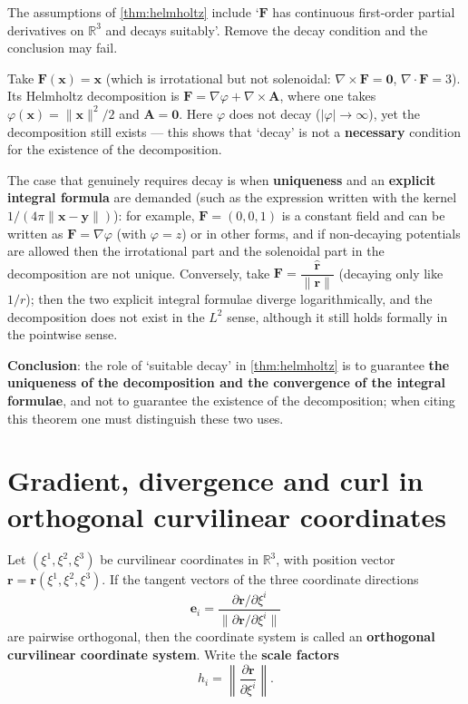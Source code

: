 \begin{example}\label{ex:helmholtz_decay_fails}
The assumptions of \cref{thm:helmholtz} include `$\mathbf F$ has continuous first-order partial derivatives on $\mathbb R^3$ and decays suitably'. Remove the decay condition and the conclusion may fail.

Take $\mathbf F(\mathbf x) = \mathbf x$ (which is irrotational but not solenoidal: $\nabla\times\mathbf F=\mathbf 0$, $\nabla\cdot\mathbf F=3$). Its Helmholtz decomposition is $\mathbf F = \nabla\varphi+\nabla\times\mathbf A$, where one takes $\varphi(\mathbf x)=\|\mathbf x\|^2/2$ and $\mathbf A=\mathbf 0$. Here $\varphi$ does not decay ($|\varphi|\to\infty$), yet the decomposition still exists --- this shows that `decay' is not a \textbf{necessary} condition for the existence of the decomposition.

The case that genuinely requires decay is when \textbf{uniqueness} and an \textbf{explicit integral formula} are demanded (such as the expression written with the kernel $1/(4\pi\|\mathbf x-\mathbf y\|)$): for example, $\mathbf F=(0,0,1)$ is a constant field and can be written as $\mathbf F=\nabla\varphi$ (with $\varphi=z$) or in other forms, and if non-decaying potentials are allowed then the irrotational part and the solenoidal part in the decomposition are not unique. Conversely, take $\mathbf F=\dfrac{\hat{\mathbf r}}{\|\mathbf r\|}$ (decaying only like $1/r$); then the two explicit integral formulae diverge logarithmically, and the decomposition does not exist in the $L^2$ sense, although it still holds formally in the pointwise sense.

\textbf{Conclusion}: the role of `suitable decay' in \cref{thm:helmholtz} is to guarantee \textbf{the uniqueness of the decomposition and the convergence of the integral formulae}, and not to guarantee the existence of the decomposition; when citing this theorem one must distinguish these two uses.
\end{example}

\section{Gradient, divergence and curl in orthogonal curvilinear coordinates}

\begin{definition}\label{def:orthogonal_curvilinear}
Let $(\xi^1,\xi^2,\xi^3)$ be curvilinear coordinates in $\mathbb R^3$, with position vector $\mathbf r = \mathbf r(\xi^1,\xi^2,\xi^3)$. If the tangent vectors of the three coordinate directions
\[
\mathbf e_i = \frac{\partial\mathbf r/\partial\xi^i}{\|\partial\mathbf r/\partial\xi^i\|}
\]
are pairwise orthogonal, then the coordinate system is called an \textbf{orthogonal curvilinear coordinate system}. Write the \textbf{scale factors}
\[
h_i = \left\|\frac{\partial\mathbf r}{\partial\xi^i}\right\|.
\]
\end{definition}

